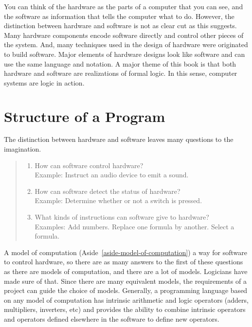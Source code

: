 You can think of the hardware as
the parts of a computer that you can see,
and the software as information that tells the computer what to do.
However, the distinction between hardware and software is not as
clear cut as this suggests. Many hardware components
encode software directly and control other pieces of the system.
And, many techniques used in the design of
hardware were originated to build software.
Major elements of hardware designs look like software
and can use the same language and notation.
A major theme of this book
is that both hardware and software are realizations of formal logic.
In this sense, computer systems are 
logic in action.

\section{Structure of a Program}

The distinction between hardware and software
leaves many questions to the imagination.
\begin{quote}
\begin{enumerate}
\item How can software control hardware?\\
      Example: Instruct an audio device to emit a sound.
\item How can software detect the status of hardware?\\
      Example: Determine whether or not a switch is pressed.
\item What kinds of instructions can software give to hardware?\\
      Examples: Add numbers. Replace one formula by another. Select a formula.
\end{enumerate}
\end{quote}

A model of computation (Aside~\ref{aside-model-of-computation})
a way for software to control hardware,
so there are as many answers to the first of these questions
as there are models of computation, and
there are a lot of models.
Logicians have made sure of that.
Since there are many equivalent models,
the requirements of a project can guide the choice of models.
Generally, a programming language based on any model of computation
has intrinsic arithmetic and logic operators
(adders, multipliers, inverters, etc)
and provides the ability to combine 
intrinsic operators and operators
defined elsewhere in the software to
define new operators.

